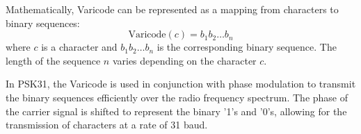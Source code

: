 Mathematically, Varicode can be represented as a mapping from characters to binary sequences:
\[
\text{Varicode}(c) = b_1b_2\dots b_n
\]
where \( c \) is a character and \( b_1b_2\dots b_n \) is the corresponding binary sequence. The length of the sequence \( n \) varies depending on the character \( c \).

In PSK31, the Varicode is used in conjunction with phase modulation to transmit the binary sequences efficiently over the radio frequency spectrum. The phase of the carrier signal is shifted to represent the binary '1's and '0's, allowing for the transmission of characters at a rate of 31 baud.

